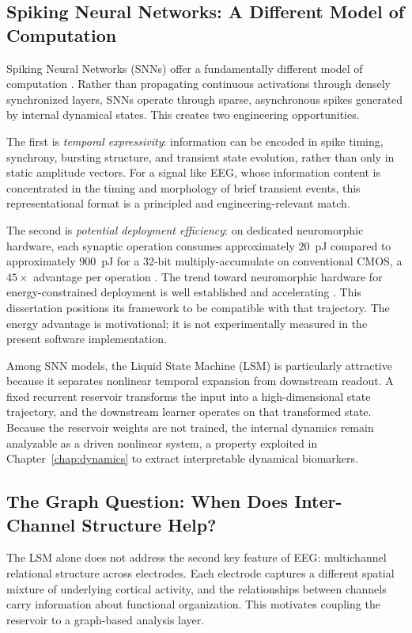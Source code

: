 \subsection{Spiking Neural Networks: A Different Model of Computation}

Spiking Neural Networks (SNNs) offer a fundamentally different model of computation \cite{maass_networks_1997}. Rather than propagating continuous activations through densely synchronized layers, SNNs operate through sparse, asynchronous spikes generated by internal dynamical states. This creates two engineering opportunities.

The first is \emph{temporal expressivity}: information can be encoded in spike timing, synchrony, bursting structure, and transient state evolution, rather than only in static amplitude vectors. For a signal like EEG, whose information content is concentrated in the timing and morphology of brief transient events, this representational format is a principled and engineering-relevant match.

The second is \emph{potential deployment efficiency}: on dedicated neuromorphic hardware, each synaptic operation consumes approximately $20$~pJ compared to approximately $900$~pJ for a 32-bit multiply-accumulate on conventional CMOS, a $45\times$ advantage per operation \cite{davies2018loihi}. The trend toward neuromorphic hardware for energy-constrained deployment is well established and accelerating \cite{schuman2022neuromorphic}. This dissertation positions its framework to be compatible with that trajectory. The energy advantage is motivational; it is not experimentally measured in the present software implementation.

Among SNN models, the Liquid State Machine (LSM) is particularly attractive because it separates nonlinear temporal expansion from downstream readout. A fixed recurrent reservoir transforms the input into a high-dimensional state trajectory, and the downstream learner operates on that transformed state. Because the reservoir weights are not trained, the internal dynamics remain analyzable as a driven nonlinear system, a property exploited in Chapter~\ref{chap:dynamics} to extract interpretable dynamical biomarkers.

\subsection{The Graph Question: When Does Inter-Channel Structure Help?}

The LSM alone does not address the second key feature of EEG: multichannel relational structure across electrodes. Each electrode captures a different spatial mixture of underlying cortical activity, and the relationships between channels carry information about functional organization. This motivates coupling the reservoir to a graph-based analysis layer.

